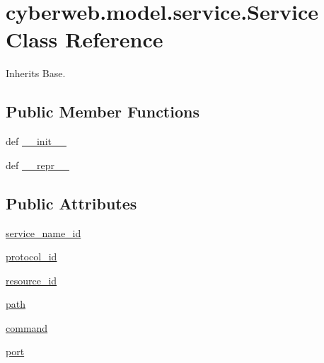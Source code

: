 \hypertarget{classcyberweb_1_1model_1_1service_1_1_service}{\section{cyberweb.\-model.\-service.\-Service \-Class \-Reference}
\label{classcyberweb_1_1model_1_1service_1_1_service}
}


\-Inherits \-Base.

\subsection*{\-Public \-Member \-Functions}
\begin{DoxyCompactItemize}
\item 
def \hyperlink{classcyberweb_1_1model_1_1service_1_1_service_ad6544dd31b364f3a5627668f4b169991}{\-\_\-\-\_\-init\-\_\-\-\_\-}
\item 
def \hyperlink{classcyberweb_1_1model_1_1service_1_1_service_a625731112e6d9bac8ad195fefef3d3fc}{\-\_\-\-\_\-repr\-\_\-\-\_\-}
\end{DoxyCompactItemize}
\subsection*{\-Public \-Attributes}
\begin{DoxyCompactItemize}
\item 
\hyperlink{classcyberweb_1_1model_1_1service_1_1_service_aa9ec1ae71d0a798d82947c4a106cd3b7}{service\-\_\-name\-\_\-id}
\item 
\hyperlink{classcyberweb_1_1model_1_1service_1_1_service_aecb83e6b12c8f60ceaf5ee2e00c3b874}{protocol\-\_\-id}
\item 
\hyperlink{classcyberweb_1_1model_1_1service_1_1_service_af08d244502917a9ad134e84c47197f84}{resource\-\_\-id}
\item 
\hyperlink{classcyberweb_1_1model_1_1service_1_1_service_a9585a72216716be58078c62d5738f641}{path}
\item 
\hyperlink{classcyberweb_1_1model_1_1service_1_1_service_a95b33517acd64b8c8a30cca63ebedac2}{command}
\item 
\hyperlink{classcyberweb_1_1model_1_1service_1_1_service_a6ffa976030d7eeaa9c07b656ac75cafa}{port}
\end{DoxyCompactItemize}
